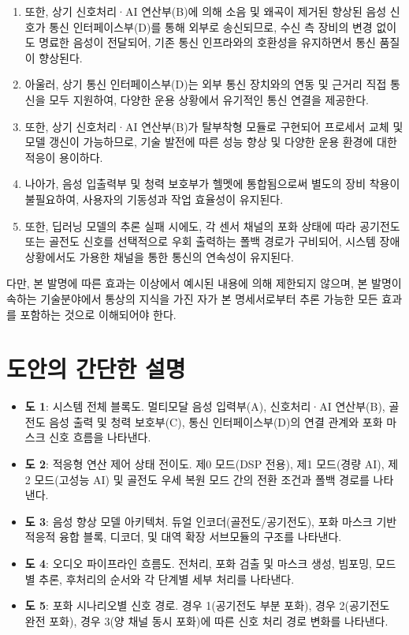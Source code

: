 \documentclass{article}
\begin{document}
\begin{enumerate}[label = \textbf{(\arabic*)}]
    \item 또한, 상기 신호처리·AI 연산부(B)에 의해 소음 및 왜곡이 제거된 향상된 음성 신호가 통신 인터페이스부(D)를 통해 외부로 송신되므로, 수신 측 장비의 변경 없이도 명료한 음성이 전달되어, 기존 통신 인프라와의 호환성을 유지하면서 통신 품질이 향상된다.
    
    \item 아울러, 상기 통신 인터페이스부(D)는 외부 통신 장치와의 연동 및 근거리 직접 통신을 모두 지원하여, 다양한 운용 상황에서 유기적인 통신 연결을 제공한다.

    \item 또한, 상기 신호처리·AI 연산부(B)가 탈부착형 모듈로 구현되어 프로세서 교체 및 모델 갱신이 가능하므로, 기술 발전에 따른 성능 향상 및 다양한 운용 환경에 대한 적응이 용이하다. 
    
    \item 나아가, 음성 입출력부 및 청력 보호부가 헬멧에 통합됨으로써 별도의 장비 착용이 불필요하여, 사용자의 기동성과 작업 효율성이 유지된다.

    \item 또한, 딥러닝 모델의 추론 실패 시에도, 각 센서 채널의 포화 상태에 따라 공기전도 또는 골전도 신호를 선택적으로 우회 출력하는 폴백 경로가 구비되어, 시스템 장애 상황에서도 가용한 채널을 통한 통신의 연속성이 유지된다.

\end{enumerate}

다만, 본 발명에 따른 효과는 이상에서 예시된 내용에 의해 제한되지 않으며, 본 발명이 속하는 기술분야에서 통상의 지식을 가진 자가 본 명세서로부터 추론 가능한 모든 효과를 포함하는 것으로 이해되어야 한다.





\section{도안의 간단한 설명}

\begin{itemize}
    \item \textbf{도 1}: 시스템 전체 블록도. 멀티모달 음성 입력부(A), 신호처리·AI 연산부(B), 골전도 음성 출력 및 청력 보호부(C), 통신 인터페이스부(D)의 연결 관계와 포화 마스크 신호 흐름을 나타낸다.
    \item \textbf{도 2}: 적응형 연산 제어 상태 전이도. 제0 모드(DSP 전용), 제1 모드(경량 AI), 제2 모드(고성능 AI) 및 골전도 우세 복원 모드 간의 전환 조건과 폴백 경로를 나타낸다.
    \item \textbf{도 3}: 음성 향상 모델 아키텍처. 듀얼 인코더(골전도/공기전도), 포화 마스크 기반 적응적 융합 블록, 디코더, 및 대역 확장 서브모듈의 구조를 나타낸다.
    \item \textbf{도 4}: 오디오 파이프라인 흐름도. 전처리, 포화 검출 및 마스크 생성, 빔포밍, 모드별 추론, 후처리의 순서와 각 단계별 세부 처리를 나타낸다.
    \item \textbf{도 5}: 포화 시나리오별 신호 경로. 경우 1(공기전도 부분 포화), 경우 2(공기전도 완전 포화), 경우 3(양 채널 동시 포화)에 따른 신호 처리 경로 변화를 나타낸다.
\end{itemize}
\end{document}

